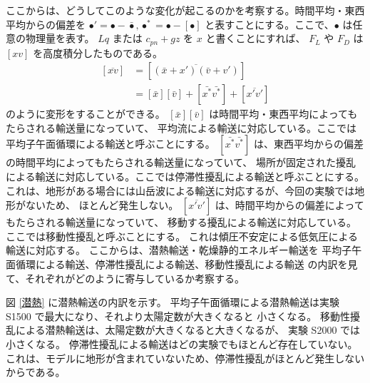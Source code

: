 \documentclass[body]{subfiles}
\begin{document}
ここからは、どうしてこのような変化が起こるのかを考察する。時間平均・東西平均からの偏差を
\(\bullet'=\bullet-\bar\bullet, \bullet^*=\bullet-[\bullet]\)
と表すことにする。ここで、\(\bullet\) は任意の物理量を表す。
\(Lq\) または \(c_{pn}+gz\) を \(x\) と書くことにすれば、
\(F_L\) や \(F_D\) は \([xv]\) を高度積分したものである。
\begin{equation}
	\begin{split}
		[\overline{xv}]&=[\overline{(\bar x+x')(\bar v+v')}]\\
		&=[\bar x][\bar v]+[\bar{x^*}\bar{v^*}]+[\overline{x'v'}]
	\end{split}\label{keith5}
\end{equation}
のように変形をすることができる。
\([\bar x][\bar v]\) は時間平均・東西平均によってもたらされる輸送量になっていて、
平均流による輸送に対応している。ここでは平均子午面循環による輸送と呼ぶことにする。
\([\bar{x^*}\bar{v^*}]\) は、東西平均からの偏差の時間平均によってもたらされる輸送量になっていて、
場所が固定された擾乱による輸送に対応している。ここでは停滞性擾乱による輸送と呼ぶことにする。
これは、地形がある場合には山岳波による輸送に対応するが、今回の実験では地形がないため、
ほとんど発生しない。
\([\overline{x'v'}]\) は、時間平均からの偏差によってもたらされる輸送量になっていて、
移動する擾乱による輸送に対応している。ここでは移動性擾乱と呼ぶことにする。
これは傾圧不安定による低気圧による輸送に対応する。
ここからは、潜熱輸送・乾燥静的エネルギー輸送を
平均子午面循環による輸送、停滞性擾乱による輸送、移動性擾乱による輸送
の内訳を見て、それぞれがどのように寄与しているか考察する。

図 \ref{潜熱} に潜熱輸送の内訳を示す。
平均子午面循環による潜熱輸送は実験 S1500 で最大になり、それより太陽定数が大きくなると
小さくなる。
移動性擾乱による潜熱輸送は、太陽定数が大きくなると大きくなるが、
実験 S2000 では小さくなる。
停滞性擾乱による輸送はどの実験でもほとんど存在していない。
これは、モデルに地形が含まれていないため、停滞性擾乱がほとんど発生しないからである。
\end{document}
